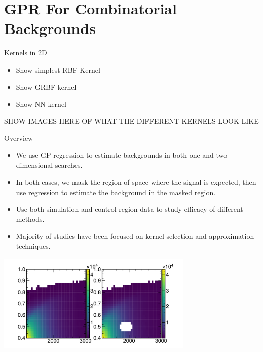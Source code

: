 \documentclass[10pt]{beamer}
\begin{document}
\section[GPR Result]{GPR For Combinatorial Backgrounds}
\label{sec:2d-gauss-proc}

\begin{frame}{Kernels in 2D}
  \begin{itemize}
  \item Show simplest RBF Kernel
  \item Show GRBF kernel
  \item Show NN kernel
  \end{itemize}

  SHOW IMAGES HERE OF WHAT THE DIFFERENT KERNELS LOOK LIKE
\end{frame}


\begin{frame}{Overview}
  \begin{itemize}
  \item We use GP regression to estimate backgrounds in both one and two dimensional searches.
  \item In both cases, we mask the region of space where the signal is expected, then use regression to estimate the background in the masked region.
  \item Use both simulation and control region data to study efficacy of different methods. 
  \item Majority of studies have been focused on kernel selection and approximation techniques.
  \end{itemize}

  \begin{center}
    \includegraphics[width=0.7\textwidth]{figures/example_masking}
  \end{center}
\end{frame}
\end{document}
